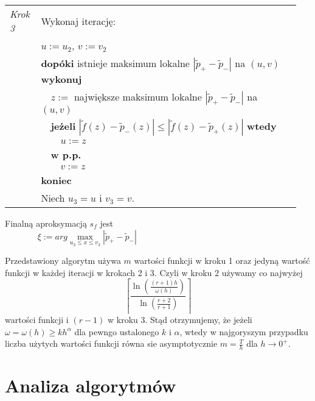 \documentclass[oik, pdftex, robocza, man]{mgrwms}
\begin{document}
\begin{tabular}{p{0.10\linewidth} p{0.85\linewidth}}
        \textit{Krok 3} & Wykonaj iterację: \\
                        & $u := u_2$, $v := v_2$ \\
                        & \textbf{dopóki} istnieje maksimum lokalne $|\tilde{p}_{+} - \tilde{p}_{-}|$ na $(u,v)$ \textbf{wykonuj} \\
                        & $\quad$$z :=$ największe maksimum lokalne $|\tilde{p}_{+} - \tilde{p}_{-}|$ na $(u,v)$ \\
                        & $\quad$\textbf{jeżeli} $|\tilde{f}(z) - \tilde{p}_{-}(z)| \leq |\tilde{f}(z) - \tilde{p}_{+}(z)|$ \textbf{wtedy} \\
                        & $\quad\quad$$u:= z$ \\
                        & $\quad$\textbf{w p.p.} \\
                        & $\quad\quad$$v:= z$ \\
                        & \textbf{koniec} \\
                        & Niech $u_3 = u$ i $v_3 = v$.
    \end{tabular} \vspace{10pt}

    Finalną aproksymacją $s_f$ jest
    \begin{equation*}
            \xi := arg \max_{u_3 \leq x \leq v_3}|\tilde{p}_{+} - \tilde{p}_{-}| \hspace{200pt}
    \end{equation*}

    Przedstawiony algorytm używa $m$ wartości funkcji w kroku 1 oraz jedyną wartość funkcji w każdej iteracji w krokach 2 i 3. Czyli w kroku 2 używamy co najwyżej
    \begin{equation*}
        \left\lceil\frac{\ln \left(\frac{(r+1) h}{\omega(h)}\right)}{\ln \left(\frac{r+2}{r+1}\right)}\right\rceil
    \end{equation*}
    wartości funkcji i $(r-1)$ w kroku 3.
    Stąd otrzymujemy, że jeżeli $\omega = \omega(h) \geq kh^{\alpha}$ dla pewngo ustalonego $k$ i $\alpha$, wtedy w najgoryszym przypadku liczba użytych wartości funkcji równa sie asymptotycznie $m = \frac{T}{h}$ dla $h \rightarrow 0^{+}$.


\mgrclosechapter


\chapter{Analiza algorytmów} \label{rozdzial_analiza_alg}
\end{document}
